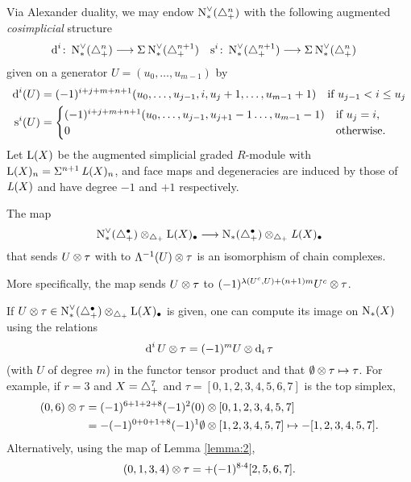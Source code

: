 Via Alexander duality, we may endow $\operatorname{N}^\vee_{*}(\triangle_{+}^n)$ with the following augmented \emph{cosimplicial} structure
\begin{align*}
	\operatorname{d}^i \colon \operatorname{N}^\vee_{*}(\triangle_{+}^n) & \longrightarrow \Sigma^{}\operatorname{N}^\vee_{*}(\triangle_{+}^{n+1})
	&
	\operatorname{s}^i \colon \operatorname{N}^\vee_{*}(\triangle_{+}^{n+1}) & \longrightarrow \Sigma^{}\operatorname{N}^\vee_{*}(\triangle_{+}^n)
\end{align*}
given on a generator $U=(u_0,\dots,u_{m-1})$ by
\begin{align*}
	\operatorname{d}^i(U) &=
	(-1)^{i+j+m+n+1}(u_0,\dots,u_{j-1},i,u_{j}+1,\dots,u_{m-1}+1)
	\quad \text{if $u_{j-1}<i \leq u_{j}$}
	\\
	\operatorname{s}^i(U) &= \begin{cases}
	(-1)^{i+j+m+n+1}(u_0,\dots,u_{j-1},u_{j+1}-1\dots,u_{m-1}-1) & \text{if $u_{j} = i$,}
	\\
	0 & \text{otherwise.}
	\end{cases}
\end{align*}
 Let $\operatorname{L}(X)$ be the augmented simplicial graded $R$-module with $\operatorname{L}(X)_n = \Sigma^{n+1}\operatorname{{\it L}}(X)_{n}$, and face maps and degeneracies are induced by those of $\operatorname{{\it L}}(X)$ and have degree $-1$ and $+1$ respectively.

\begin{lemma}\label{lemma:2} The map
	\[
	\operatorname{N}^\vee_{*}(\triangle_{+}^\bullet) \otimes_{\triangle_{+}} \operatorname{L}(X)_\bullet \longrightarrow \operatorname{N}_{*}(\triangle_{+}^\bullet) \otimes_{\triangle_{+}} \operatorname{{\it L}}(X)_\bullet
	\]
	that sends $U \otimes \tau$ with to $\Lambda^{-1}(U) \otimes \tau$ is an isomorphism of chain complexes.
\end{lemma}
More specifically, the map sends $U \otimes \tau$ to $(-1)^{\lambda(U^c,U)+(n+1)m} U^c \otimes \tau$.
\begin{example}\label{example:first3} If $U \otimes \tau\in \operatorname{N}^\vee_{*}(\triangle_{+}^\bullet) \otimes_{\triangle_{+}} \operatorname{L}(X)_\bullet$ is given, one can compute its image on $\operatorname{N}_{*}(X)$ using the relations
\[
	\operatorname{d}^i U \otimes \tau = (-1)^{m} U \otimes \operatorname{d}_i\tau
\]
 (with $U$ of degree $m$) in the functor tensor product and that $\emptyset \otimes \tau \mapsto \tau$. For example, if $r=3$ and $X=\triangle_{+}^7$ and $\tau = [0,1,2,3,4,5,6,7]$ is the top simplex,
\begin{align*}
		(0,6) \otimes \tau &= (-1)^{6+1+2+8}(-1)^2(0) \otimes [0,1,2,3,4,5,7]
		\\
		&= -(-1)^{0+0+1+8}(-1)^1\emptyset \otimes [1,2,3,4,5,7]\mapsto -[1,2,3,4,5,7].
\end{align*}
Alternatively, using the map of Lemma \ref{lemma:2},
\[
	(0,1,3,4) \otimes \tau = +(-1)^{8\cdot 4}[2,5,6,7].
\]
\end{example}


